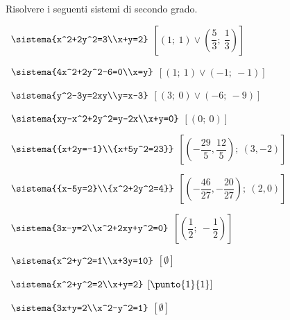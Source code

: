\begin{esercizio}[\Ast]
 \label{ese:6.1}
Risolvere i seguenti sistemi di secondo grado.
\begin{multicols}{2}
 \begin{enumeratea}
 \item~\(\sistema{x^2+2y^2=3\\x+y=2}\)
\hfill\(\left[\left(1;~1\right) \vee 
        \left(\dfrac 5 3;~\dfrac{1}{3}\right)\right]\)
 \item~\(\sistema{4x^2+2y^2-6=0\\x=y}\)
\hfill\(\left[\left(1;~1\right)\vee \left(-1;~-1\right)\right]\)
 \item~\(\sistema{y^2-3y=2xy\\y=x-3}\)
\hfill\(\left[\left(3;~0\right)\vee \left(-6;~-9\right)\right]\)
 \item~\(\sistema{xy-x^2+2y^2=y-2x\\x+y=0}\)
\hfill\(\left[\left(0;~0\right)\right]\)
 \item~\(\sistema{{x+2y=-1}\\{x+5y^2=23}}\)
\hfill\(\left[\left(-\dfrac{29} 5,\dfrac{12} 5\right);~   
              (3,-2)\right]\)
 \item~\(\sistema{{x-5y=2}\\{x^2+2y^2=4}}\)
\hfill\(\left[\left(-\dfrac{46}{27},-\dfrac{20}{27}\right);~
(2,0)\right]\)
 \item~\(\sistema{3x-y=2\\x^2+2xy+y^2=0}\)
\hfill\(\left[\left(\dfrac 1 2;~-\dfrac 1 2\right)\right]\)
 \item~\(\sistema{x^2+y^2=1\\x+3y=10}\)
\hfill\(\left[\emptyset\right]\)
 \item~\(\sistema{x^2+y^2=2\\x+y=2}\)
\hfill\(\left[\punto{1}{1}\right]\)
 \item~\(\sistema{3x+y=2\\x^2-y^2=1}\)
\hfill\(\left[\emptyset\right]\)
 \end{enumeratea}
 \end{multicols}
\end{esercizio}

